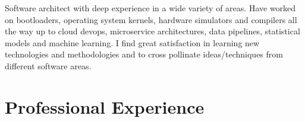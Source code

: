 \documentclass[11pt,a4paper,sans]{moderncv}        %
\begin{document}
\makecvtitle

Software architect with deep experience in a wide variety of areas. Have worked
on bootloaders, operating system kernels, hardware simulators and compilers all
the way up to cloud devops, microservice architectures, data pipelines,
statistical models and machine learning. I find great satisfaction in learning
new technologies and methodologies and to cross pollinate ideas/techniques from
different software areas. 

\section{Professional Experience}
\end{document}
